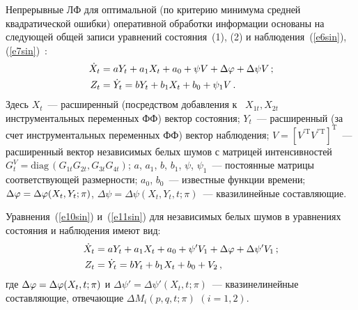 \begin{multicols}{2}
\smallskip
 
Непрерывные ЛФ для оптимальной (по критерию минимума средней квадратической ошибки) оперативной обработки 
информации основаны на следующей общей записи уравнений состояния~(1), (2) и наблюдения~(\ref{e6sin}), 
(\ref{e7sin})~\cite{4sin}:
\begin{align}
\dot X_t &= a Y_t + a_1 X_t + a_0 +\psi V+\Delta \varphi +\Delta \psi V\,;\label{e10sin}\\
Z_t &=\dot Y_t = b Y_t + b_1 X_t + b_0 +\psi_1 V\,.\label{e11sin}
\end{align}
Здесь $X_t$~--- расширенный (посредством добавления к~ $X_{1t}, X_{2t}$ инструментальных переменных ФФ) 
вектор состояния; $Y_t$~--- расширенный (за счет инструментальных переменных ФФ) вектор наблюдения; 
$V=[V^{'\mathrm{T}} V^{''\mathrm{T}}]^{\mathrm{T}}$~--- расширенный вектор независимых белых шумов с матрицей интенсивностей 
$G_t^V =\mathrm{diag}\,(G_{1t} G_{2t}, G_{3t} G_{4t})$; 
$a$, $a_1$, $b$, $b_1$, $\psi$, $\psi_1$~--- постоянные матрицы соответствующей размерности; 
$a_0$, $b_0$~--- известные функции времени; 
$\Delta\varphi =\Delta\varphi (X_t, Y_t ;\pi)$, $\Delta\psi =\Delta \psi (X_t, Y_t, t;\pi)$~--- квазилинейные составляющие.

Уравнения~(\ref{e10sin}) и~(\ref{e11sin}) для независимых белых шумов в уравнениях состояния и наблюдения имеют вид:
\begin{align}
\dot X_t &= a Y_t + a_1 X_t + a_0 +\psi' V_1 +\Delta\varphi +\Delta\psi' V_1\,;\label{e12sin}\\
Z_t &=\dot Y_t = b Y_t + b_1 X_t + b_0 + V_2\,,\label{e13sin}
\end{align}
где $\Delta \varphi= \Delta \varphi (X_t, t;\pi)$ и $\Delta \psi' =\Delta \psi' (X_t, t;\pi)$~--- 
квазинелинейные составляющие, отвечающие $\Delta M_i (p,q,t;\pi)$ $(i=1,2)$.


\end{multicols}
